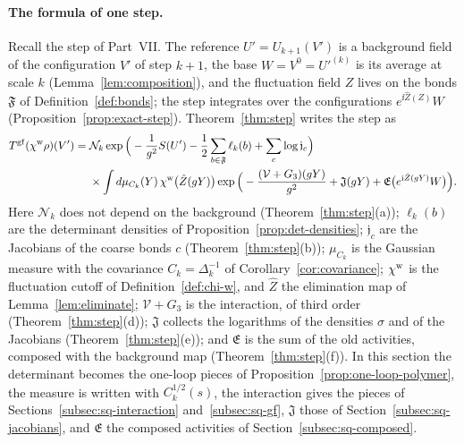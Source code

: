 \paragraph{The formula of one step.}\label{par:step-formula}%
Recall the step of Part~VII. The reference $U'=U_{k+1}(V')$ is a background field of the configuration $V'$ of step $k+1$, the base $W=V^0=U'^{(k)}$ is its average at scale $k$ (Lemma~\ref{lem:composition}), and the fluctuation field $Z$ lives on the bonds $\mathfrak F$ of Definition~\ref{def:bonds}; the step integrates over the configurations $e^{\ii\hat Z(Z)}W$ (Proposition~\ref{prop:exact-step}). Theorem~\ref{thm:step} writes the step as
\[
\begin{aligned}
T^{\rm gf}(\chi^{\rm w}\rho)(V')={}&\mathcal N_k\exp\Big(-\frac1{g^2}S(U')-\frac12\sum_{b\in\mathfrak F}\ell_k(b)+\sum_c\log\mathfrak j_c\Big)\\
&\times\int d\mu_{C_k}(Y)\,\chi^{\rm w}\big(\hat Z(gY)\big)\exp\Big(-\frac{(\mathcal V+G_3)(gY)}{g^2}+\mathfrak J(gY)+\mathfrak E\big(e^{\mathrm i\hat Z(gY)}W\big)\Big).
\end{aligned}
\]
Here $\mathcal N_k$ does not depend on the background (Theorem~\ref{thm:step}(a)); $\ell_k(b)$ are the determinant densities of Proposition~\ref{prop:det-densities}; $\mathfrak j_c$ are the Jacobians of the coarse bonds $c$ (Theorem~\ref{thm:step}(b)); $\mu_{C_k}$ is the Gaussian measure with the covariance $C_k=\Delta_k^{-1}$ of Corollary~\ref{cor:covariance}; $\chi^{\rm w}$ is the fluctuation cutoff of Definition~\ref{def:chi-w}, and $\hat Z$ the elimination map of Lemma~\ref{lem:eliminate}; $\mathcal V+G_3$ is the interaction, of third order (Theorem~\ref{thm:step}(d)); $\mathfrak J$ collects the logarithms of the densities $\sigma$ and of the Jacobians (Theorem~\ref{thm:step}(e)); and $\mathfrak E$ is the sum of the old activities, composed with the background map (Theorem~\ref{thm:step}(f)). In this section the determinant becomes the one-loop pieces of Proposition~\ref{prop:one-loop-polymer}, the measure is written with $C_k^{1/2}(s)$, the interaction gives the pieces of Sections~\ref{subsec:sq-interaction} and~\ref{subsec:sq-gf}, $\mathfrak J$ those of Section~\ref{subsec:sq-jacobians}, and $\mathfrak E$ the composed activities of Section~\ref{subsec:sq-composed}.

